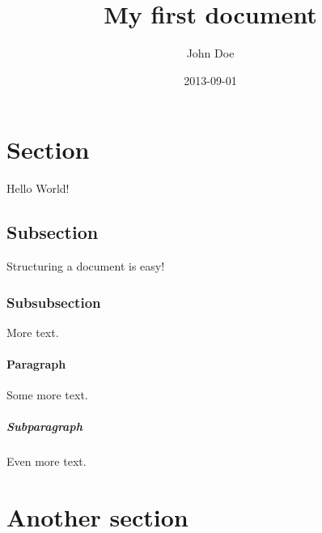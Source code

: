\documentclass{article}
\title{My first document}
\date{2013-09-01}
\author{John Doe}
\begin{document}
  \maketitle				%

  \newpage 				%


 
  \section{Section}			%

  Hello World!

  \subsection{Subsection}

  Structuring a document is easy!

  \subsubsection{Subsubsection}

  More text.

  \paragraph{Paragraph}

  Some more text.

  \subparagraph{Subparagraph}

  Even more text.

  \section{Another section}
\end{document}
